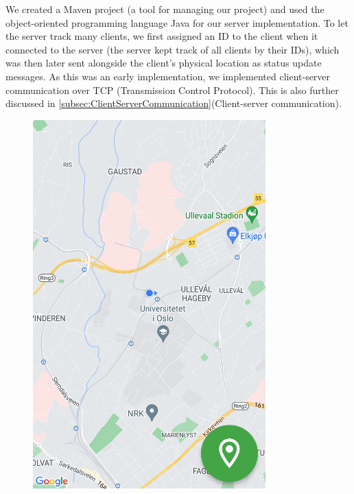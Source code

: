 \documentclass{article}
\begin{document}
We created a Maven project (a tool for managing our project) and used the object-oriented programming language Java for our server implementation. To let the server track many clients, we first assigned an ID to the client when it connected to the server (the server kept track of all clients by their IDs), which was then later sent alongside the client's physical location as status update messages. As this was an early implementation, we implemented client-server communication over TCP (Transmission Control Protocol). This is also further discussed in \ref{subsec:ClientServerCommunication}(Client-server communication).

\begin{figure}[H]
    \centering
    \begin{minipage}[c]{0.34\linewidth}
        \includegraphics[width=\linewidth]{graphics/recording_off.png}

\end{minipage}
\end{figure}
\end{document}
